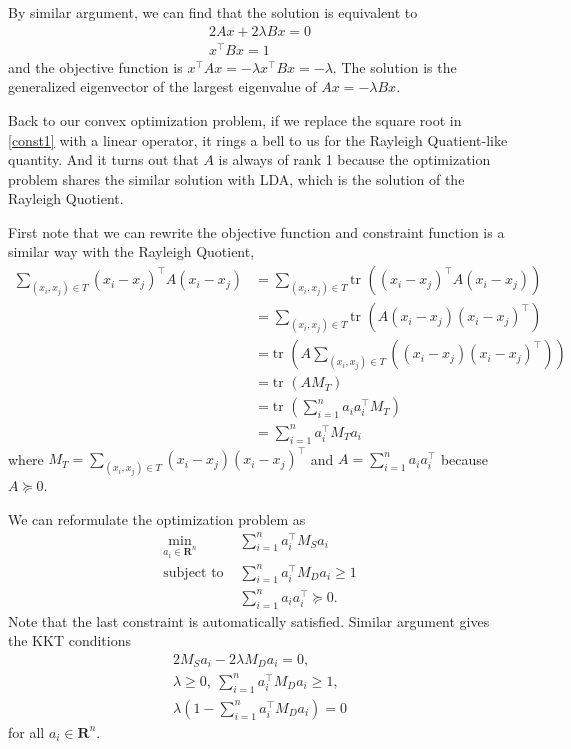 \documentclass[12pt]{article}
\newcommand\R{\mathbf{R}}
\newcommand\T{^\top}
\newcommand{\st}{\text{subject to }}
\newcommand{\tr}{\text{tr }}
\begin{document}
By similar argument, we can find that the solution is equivalent to
\begin{align}
2Ax + 2\lambda B x = 0 \\
x\T Bx  = 1
\end{align}
and the objective function is $x\T Ax = -\lambda x\T Bx = -\lambda$. The solution is the generalized eigenvector of the largest eigenvalue of $Ax=-\lambda Bx$.

Back to our convex optimization problem, if we replace the square root in \ref{const1} with a linear operator, it rings a bell to us for the Rayleigh Quatient-like quantity. And it turns out that $A$ is always of rank 1 because the optimization problem shares the similar solution with LDA, which is the solution of the Rayleigh Quotient. 

First note that we can rewrite the objective function and constraint function is a similar way with the Rayleigh Quotient,
\begin{align*}
\sum_{(x_i,x_j)\in T} (x_i-x_j)\T A(x_i-x_j) & = \sum_{(x_i,x_j)\in T} \tr((x_i-x_j)\T A(x_i-x_j)) \\
& = \sum_{(x_i,x_j)\in T} \tr( A(x_i-x_j)(x_i-x_j)\T) \\
& = \tr(A\sum_{(x_i,x_j)\in T}((x_i-x_j)(x_i-x_j)\T)) \\
& = \tr(AM_T) \\
& = \tr(\sum_{i=1}^n a_ia_i\T M_T ) \\
& = \sum_{i=1}^n a_i\T M_T a_i
\end{align*}
where $M_T = \sum_{(x_i,x_j)\in T}(x_i-x_j)(x_i-x_j)\T$ and $A=\sum_{i=1}^n a_ia_i\T$ because $A\succeq 0$. 

We can reformulate the optimization problem as 
\begin{align*}
\min_{a_i\in\R^n} & \sum_{i=1}^n a_i\T M_S a_i \\
\st & \sum_{i=1}^n a_i\T M_D a_i \geq 1 \\
& \sum_{i=1}^n a_i a_i\T\succeq 0.
\end{align*}
Note that the last constraint is automatically satisfied. Similar argument gives the KKT conditions 
\begin{align*}
2M_Sa_i - 2\lambda M_Da_i = 0, \\
\lambda \geq 0,\ \sum_{i=1}^n a_i\T M_D a_i \geq 1,\\
\lambda(1- \sum_{i=1}^n a_i\T M_D a_i) = 0
\end{align*}
for all $a_i\in\R^n$.
\end{document}

